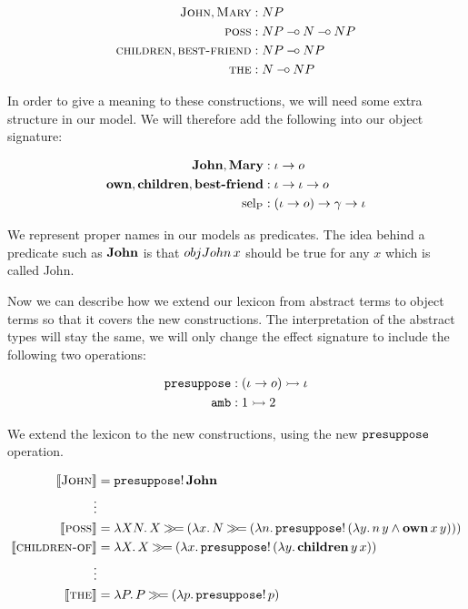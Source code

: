 \begin{align*}
  \textsc{John}, \textsc{Mary} &: NP \\
  \textsc{poss} &: NP \mathbin{{-}\mkern-3.5mu{\circ}} N \mathbin{{-}\mkern-3.5mu{\circ}} NP \\
  \textsc{children}, \textsc{best-friend} &: NP \mathbin{{-}\mkern-3.5mu{\circ}} NP \\
  \textsc{the} &: N \mathbin{{-}\mkern-3.5mu{\circ}} NP
\end{align*}

In order to give a meaning to these constructions, we will need some extra
structure in our model. We will therefore add the following into our
object signature:

\begin{align*}
  \textbf{John}, \textbf{Mary} &: \iota \to o \\
  \textbf{own}, \textbf{children}, \textbf{best-friend} &: \iota \to \iota \to o \\
  \operatorname{sel_P} &: (\iota \to o) \to \gamma \to \iota
\end{align*}

We represent proper names in our models as predicates. The idea behind a
predicate such as $\textbf{John}$ is that $obj{John}\,x$ should be true
for any $x$ which is called John.

Now we can describe how we extend our lexicon from abstract terms to object
terms so that it covers the new constructions. The interpretation of the
abstract types will stay the same, we will only change the effect signature
to include the following two operations:

\begin{align*}
\mathtt{presuppose} &: (\iota \to o) \rightarrowtail \iota \\
\mathtt{amb} &: 1 \rightarrowtail 2
\end{align*}

We extend the lexicon to the new constructions, using the new
$\mathtt{presuppose}$ operation.

\begin{align*}
  \llbracket \textsc{John} \rrbracket &= \mathtt{presuppose}!\,\textbf{John} \\
  \vdots \\
  \llbracket \textsc{poss} \rrbracket &= \lambda X N.\, X \mathbin{\gg\!=} (\lambda x.\, N \mathbin{\gg\!=} (\lambda n.\, \mathtt{presuppose}!\,(\lambda y.\, n\,y \land \textbf{own}\,x\,y))) \\
  \llbracket \textsc{children-of} \rrbracket &= \lambda X.\, X \mathbin{\gg\!=} (\lambda x.\, \mathtt{presuppose}!\,(\lambda y.\, \textbf{children}\,y\,x)) \\
  \vdots \\
  \llbracket \textsc{the} \rrbracket &= \lambda P.\, P \mathbin{\gg\!=} (\lambda p.\, \mathtt{presuppose}!\,p)
\end{align*}

